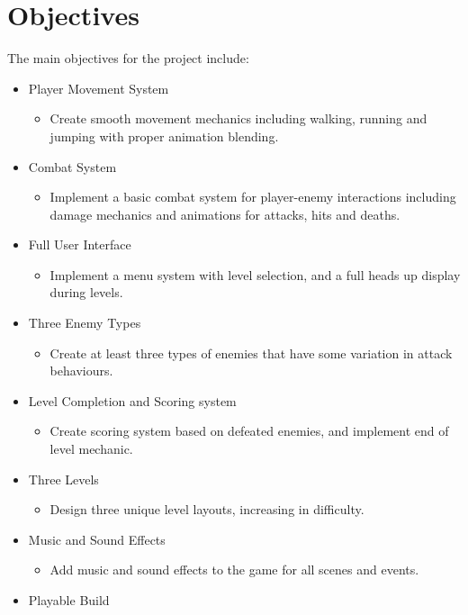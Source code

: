 \documentclass[10pt]{final_report}
\begin{document}
\section{Objectives}\label{objectives}
The main objectives for the project include:
\begin{itemize}
    \item Player Movement System
    \begin{itemize}
	\item{Create smooth movement mechanics including walking, running and jumping with proper animation blending.}
    \end{itemize}
    \item Combat System
    \begin{itemize}
	\item{Implement a basic combat system for player-enemy interactions including damage mechanics and animations for attacks, hits and deaths.}
    \end{itemize}
    \item Full User Interface
    \begin{itemize}
	\item{Implement a menu system with level selection, and a full heads up display during levels.}
    \end{itemize}
    \item Three Enemy Types
    \begin{itemize}
	\item{Create at least three types of enemies that have some variation in attack behaviours.}
    \end{itemize}
    \item Level Completion and Scoring system
    \begin{itemize}
	\item{Create scoring system based on defeated enemies, and implement end of level mechanic.}
    \end{itemize}
    \item Three Levels
    \begin{itemize}
	\item{Design three unique level layouts, increasing in difficulty.}
    \end{itemize}
    \item Music and Sound Effects
    \begin{itemize}
	\item{Add music and sound effects to the game for all scenes and events.}
    \end{itemize}
    \item Playable Build

\end{itemize}
\end{document}
